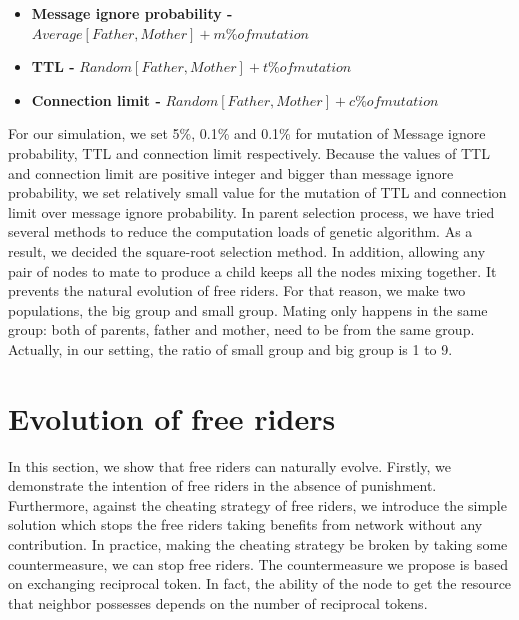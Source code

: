 \documentclass[12pt,journal,draftcls,letterpaper,onecolumn]{IEEEtran}
\begin{document}
\begin{itemize}
\item{\bf Message ignore probability -}
$Average[Father, Mother] + m\% of mutation$
\item{\bf TTL -}
$Random[Father, Mother] + t\% of mutation$
\item{\bf Connection limit -}
$Random[Father, Mother] + c\% of mutation$\\
\end{itemize}

For our simulation, we set 5\%, 0.1\% and 0.1\% for mutation of Message ignore probability,
TTL and connection limit respectively. Because the values of TTL and connection limit are
positive integer and bigger than message ignore probability, we set relatively small value for
the mutation of TTL and connection limit over message ignore probability. In parent selection
process, we have tried several methods to reduce the computation loads of genetic algorithm.
As a result, we decided the square-root selection method\cite{genetic}. In addition, allowing any pair of
nodes to mate to produce a child keeps all the nodes mixing together. It prevents the natural
evolution of free riders. For that reason, we make two populations, the big group and small
group. Mating only happens in the same group: both of parents, father and mother, need to be
from the same group. Actually, in our setting, the ratio of small group and big group is 1 to 9.

\section{Evolution of free riders}\label{sec:evolution}
In this section, we show that free riders can naturally evolve. Firstly, we demonstrate the
intention of free riders in the absence of punishment. Furthermore, against the cheating
strategy of free riders, we introduce the simple solution which stops the free riders taking
benefits from network without any contribution. In practice, making the cheating strategy be
broken by taking some countermeasure, we can stop free riders. The countermeasure we
propose is based on exchanging reciprocal token. In fact, the ability of the node to get the
resource that neighbor possesses depends on the number of reciprocal tokens.
\end{document}

